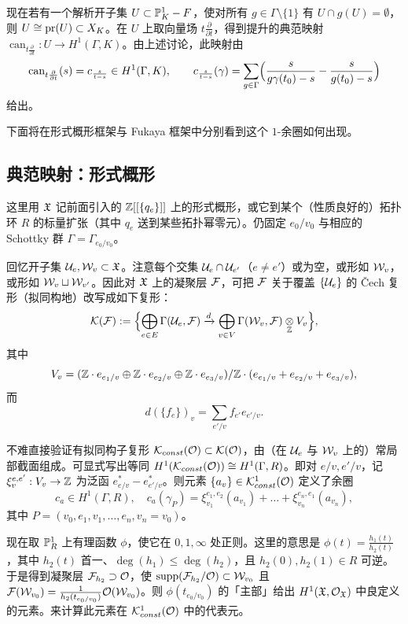 现在若有一个解析开子集 $U\subset \mathbb{P}^1_K-F$，使对所有 $g\in\Gamma\setminus\{1\}$ 有 $U\cap g(U)=\emptyset$，则 $U\cong \operatorname{pr}(U)\subset X_K$。在 $U$ 上取向量场 $t\frac{\partial}{\partial t}$，得到提升的典范映射 $\operatorname{can}_{t\frac{\partial}{\partial t}}:U\to H^1(\Gamma,K)$。由上述讨论，此映射由
\begin{equation}\label{eq:can_map_analytic}
\operatorname{can}_{t\frac{\partial}{\partial t}}(s)=c_{\frac{s}{t-s}}\in H^1(\Gamma,K),\qquad
c_{\frac{s}{t-s}}(\gamma)=\sum_{g\in\Gamma}\Bigl(\frac{s}{g\gamma(t_0)-s}-\frac{s}{g(t_0)-s}\Bigr)
\end{equation}
给出。

下面将在形式概形框架与 Fukaya 框架中分别看到这个 $1$-余圈如何出现。

\subsection{典范映射：形式概形}\label{ss:canformal}

这里用 $\mathfrak{X}$ 记前面引入的 $\mathbb{Z}[[\{q_{e}\}]]$ 上的形式概形，或它到某个（性质良好的）拓扑环 $R$ 的标量扩张（其中 $q_{e}$ 送到某些拓扑幂零元）。仍固定 $e_0/v_0$ 与相应的 Schottky 群 $\Gamma=\Gamma_{e_0/v_0}$。

回忆开子集 $\mathcal{U}_{e},\mathcal{W}_{v}\subset\mathfrak{X}$。注意每个交集 $\mathcal{U}_{e}\cap \mathcal{U}_{e'}$（$e\neq e'$）或为空，或形如 $\mathcal{W}_{v}$，或形如 $\mathcal{W}_{v}\sqcup\mathcal{W}_{v'}$。因此对 $\mathfrak{X}$ 上的凝聚层 $\mathcal{F}$，可把 $\mathcal{F}$ 关于覆盖 $\{\mathcal{U}_{e}\}$ 的 \v{C}ech 复形（拟同构地）改写成如下复形：
\[
\mathcal{K}(\mathcal{F}):=\Bigl\{\bigoplus_{e\in E}\Gamma(\mathcal{U}_{e},\mathcal{F})\xrightarrow{d}\bigoplus_{v\in V} \Gamma(\mathcal{W}_{v},\mathcal{F})\mathbin{\mathop{\otimes}\displaylimits_{\mathbb{Z}}}V_{v}\Bigr\},
\]
其中
\[
V_{v}=(\mathbb{Z}\cdot e_{e_1/v}\oplus \mathbb{Z}\cdot e_{e_2/v}\oplus \mathbb{Z}\cdot e_{e_3/v})/\mathbb{Z}\cdot (e_{e_1/v}+e_{e_2/v}+e_{e_3/v}),
\]
而
\[
d(\{f_{e}\})_{v}=\sum_{e'/v}f_{e'}e_{e'/v}.
\]

不难直接验证有拟同构子复形 $\mathcal{K}_{const}(\mathcal{O})\subset \mathcal{K}(\mathcal{O})$，由（在 $\mathcal{U}_{e}$ 与 $\mathcal{W}_{v}$ 上的）常局部截面组成。可显式写出等同 $H^1(\mathcal{K}_{const}(\mathcal{O}))\cong H^1(\Gamma,R)$。即对 $e/v,e'/v$，记 $\xi^{e,e'}_{v}:V_{v}\to\mathbb{Z}$ 为泛函 $e_{e/v}^*-e_{e'/v}^*$。则元素 $\{a_{v}\}\in \mathcal{K}^1_{const}(\mathcal{O})$ 定义了余圈
\begin{equation}\label{eq:from_Cech_to_group_cohom}
c_a\in H^1(\Gamma,R),\quad c_a(\gamma_P)=\xi_{v_1}^{e_1,e_2}(a_{v_1})+\dots+\xi_{v_n}^{e_n,e_1}(a_{v_n}),
\end{equation}
其中 $P=(v_0,e_1,v_1,\dots,e_n,v_n=v_0)$。

现在取 $\mathbb{P}^1_R$ 上有理函数 $\phi$，使它在 $0,1,\infty$ 处正则。这里的意思是 $\phi(t)=\frac{h_1(t)}{h_2(t)}$，其中 $h_2(t)$ 首一、$\deg(h_1)\leq\deg(h_2)$，且 $h_2(0),h_2(1)\in R$ 可逆。于是得到凝聚层 $\mathcal{F}_{h_2}\supset \mathcal{O}$，使 $\operatorname{supp}(\mathcal{F}_{h_2}/\mathcal{O})\subset \mathcal{W}_{v_0}$ 且 $\mathcal{F}(\mathcal{W}_{v_0})=\frac{1}{h_2(t_{e_0/v_0})}\mathcal{O}(\mathcal{W}_{v_0})$。则 $\phi(t_{e_0/v_0})$ 的「主部」给出 $H^1(\mathfrak{X},\mathcal{O}_{\mathfrak{X}})$ 中良定义的元素。来计算此元素在 $\mathcal{K}^1_{const}(\mathcal{O})$ 中的代表元。

